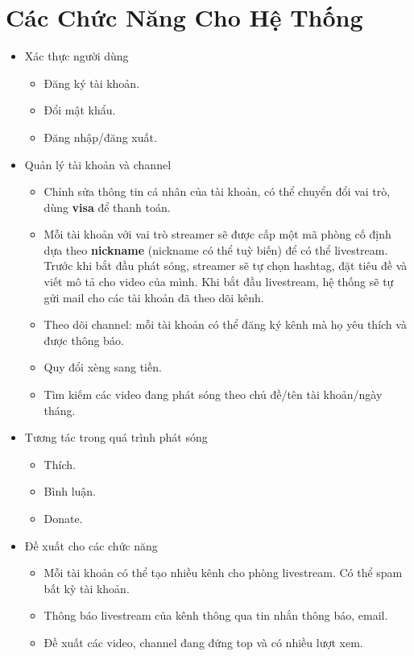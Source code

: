 \section{Các Chức Năng Cho Hệ Thống}
\begin{itemize}
	\item Xác thực người dùng
 		\begin{itemize}
   			 \item Đăng ký tài khoản.
			 \item Đổi mật khẩu.
   			 \item Đăng nhập/đăng xuất.
 		 \end{itemize}
	 \item Quản lý tài khoản và channel
 		\begin{itemize}
   			 \item Chỉnh sửa thông tin cá nhân của tài khoản, có thể chuyển đổi vai trò, dùng \textbf{visa} để thanh toán.
   			 \item Mỗi tài khoản với vai trò streamer sẽ được cấp một mã phòng cố định dựa theo \textbf{nickname} (nickname có thể tuỳ biến) để có thể livestream. Trước khi bắt đầu phát sóng, streamer sẽ tự chọn hashtag, đặt tiêu đề và viết mô tả cho video của mình. Khi bắt đầu livestream, hệ thống sẽ tự gửi mail cho các tài khoản đã theo dõi kênh.
			 \item Theo dõi channel: mỗi tài khoản có thể đăng ký kênh mà họ yêu thích và được thông báo.
			\item Quy đổi xèng sang tiền.
			\item Tìm kiếm các video đang phát sóng theo chủ đề/tên tài khoản/ngày tháng.
 	 	\end{itemize}
	\item Tương tác trong quá trình phát sóng
		\begin{itemize}
			\item Thích.
			\item Bình luận.
			\item Donate.
		\end{itemize}
	\item Đề xuất cho các chức năng
		\begin{itemize}
			\item Mỗi tài khoản có thể tạo nhiều kênh cho phòng livestream. Có thể spam bất kỳ tài khoản.
			\item Thông báo livestream của kênh thông qua tin nhắn thông báo, email.
			\item Đề xuất các video, channel đang đứng top và có nhiều lượt xem.
		\end{itemize}
\end{itemize}

